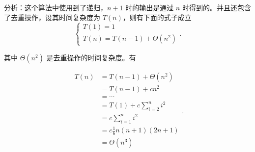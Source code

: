 \documentclass[UTF8]{ctexart}
\begin{document}
分析：这个算法中使用到了递归，$ n+1 $ 时的输出是通过 $ n $ 时得到的。并且还包含了去重操作，设其时间复杂度为 $ T\left( n \right) $，则有下面的式子成立
\[
    \begin{cases}
        T\left( 1  \right)  = 1 \\
        T\left( n \right)  = T\left( n-1  \right)  + \Theta\left( n^{2} \right)  
    \end{cases}
.\] 

其中 $ \Theta(n^{2}) $ 是去重操作的时间复杂度。有

\[
    \begin{aligned}
        T\left( n \right) &= T\left( n-1 \right)  + \Theta\left( n^{2} \right)  \\
        &=  T\left( n-1 \right)  + c n^{2}\\ 
        &= \cdots \\
        &= T\left( 1 \right)  + c \sum_{i=2}^{n} i^{2} \\
        &=  c \sum_{i=1}^{n}i^{2} \\
        &= c \frac{1}{6} n \left( n+1 \right) \left( 2n+1 \right)  \\
        &= \Theta\left( n^{3} \right)  \\
    \end{aligned}
.\] 
\end{document}
